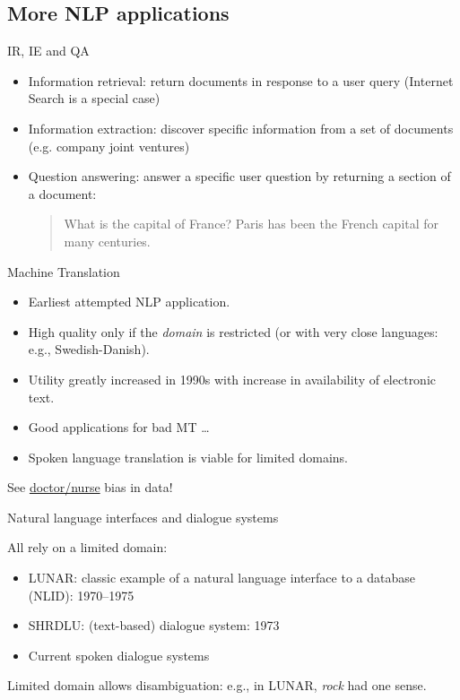 \documentclass[compress]{beamer}
\begin{document}
\subsection{More NLP applications}

\begin{frame}{IR, IE and QA}
  \begin{itemize}
  \item Information retrieval: return documents in response to a user
    query (Internet Search is a special case)
  \item Information extraction: discover specific information from a
    set of documents (e.g. company joint ventures)
  \item Question answering: answer a specific user question by
    returning a section of a document:
    \begin{quote}
      What is the capital of France? Paris has been the French
      capital for many centuries.
    \end{quote}
\end{itemize}
\end{frame}

\begin{frame}{Machine Translation}
  \begin{itemize}
  \item Earliest attempted NLP application.
  \item High quality only if the \emph{domain} is restricted (or
    with very close languages: e.g., Swedish-Danish).
  \item Utility greatly increased in 1990s with increase in
    availability of electronic text.
  \item Good applications for bad MT \ldots
  \item Spoken language translation is viable for limited domains.
  \end{itemize}

  See \href{https://translate.google.com/?sl=en\&tl=pt\&text=The\%20doctor\%20attended\%20the\%20conference.\&op=translate}{doctor/nurse} bias in data!
\end{frame}


\begin{frame}{Natural language interfaces and dialogue systems}

  All rely on a limited domain:
  \begin{itemize}
  \item LUNAR: classic example of a natural language interface to a
    database (NLID): 1970--1975
  \item SHRDLU: (text-based) dialogue system: 1973
  \item Current spoken dialogue systems
  \end{itemize}

  Limited domain allows disambiguation: e.g., in LUNAR, {\it rock} had
  one sense.
\end{frame}
\end{document}

